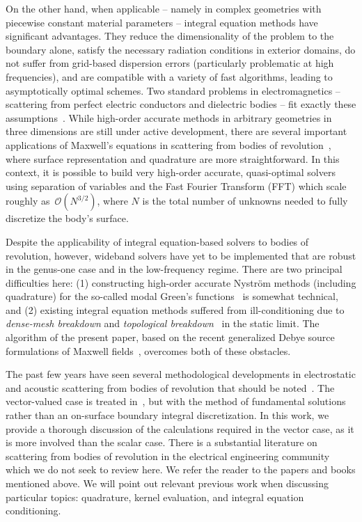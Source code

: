 \documentclass[11pt]{article}
\newcommand\cO{\mathcal O}
\numberwithin{equation}{section}
\begin{document}
On the other hand, when applicable -- namely in complex geometries
with piecewise constant material parameters -- integral
equation methods have significant advantages. They reduce the
dimensionality of the problem to the boundary alone, satisfy the 
necessary radiation conditions in exterior domains, do not suffer from
grid-based dispersion errors (particularly problematic at high
frequencies),
and are compatible with a variety of fast
algorithms, leading to asymptotically optimal schemes.
Two standard problems in electromagnetics -- scattering from perfect
electric conductors and dielectric bodies -- fit exactly these
assumptions~\cite{jackson}.  
While high-order accurate
methods in arbitrary geometries in three dimensions are still under
active development,
there are several important applications of Maxwell's equations in
scattering from bodies of revolution~\cite{Chewfastbook,mautz1979electromagnetic,
gedney1990use,Kucharski2000,helsing2015determination,liu2016efficient,viola},
where surface representation and quadrature are more straightforward.
In this context, it is possible to build very high-order accurate, quasi-optimal
solvers using separation of variables and the Fast Fourier Transform
(FFT) which scale roughly as~$\cO(N^{3/2})$, where $N$ is the total number
of unknowns needed to fully discretize the body's surface.

Despite the applicability of integral
equation-based solvers to bodies of revolution, however, wideband solvers have
yet to be implemented that are robust in the genus-one case and 
in the low-frequency regime. There are two principal difficulties here:
(1) constructing high-order accurate Nystr\"om methods
(including quadrature) for the so-called modal Green's
functions~\cite{conway_cohl} is somewhat technical, and (2) existing
integral equation methods suffered from ill-conditioning due to
\emph{dense-mesh breakdown} and \emph{topological
  breakdown}~\cite{cools-2009,EpGr,EpGrOn} in the static limit.  The
algorithm of the present paper, based on the recent generalized Debye source
formulations of Maxwell fields~\cite{EpGr,EpGrOn}, overcomes both of
these obstacles.  

The past few years have seen several methodological developments in
electrostatic and acoustic scattering from bodies of revolution that
should be noted~\cite{helsing_2014,young}.  The vector-valued case is
treated in~\cite{liu2016efficient}, but with the method of fundamental
solutions~\cite{barnett2008stability,fairweather1998method} rather
than an on-surface boundary integral discretization.  In this work, we
provide a thorough discussion of the calculations required in the
vector case, as it is more involved than the scalar case.  There is a
substantial literature on scattering from bodies of revolution in the
electrical engineering community which we do not seek to review here.
We refer the reader to the papers and books mentioned above. We will
point out relevant previous work when discussing particular topics:
quadrature, kernel evaluation, and integral equation conditioning.
\end{document}
